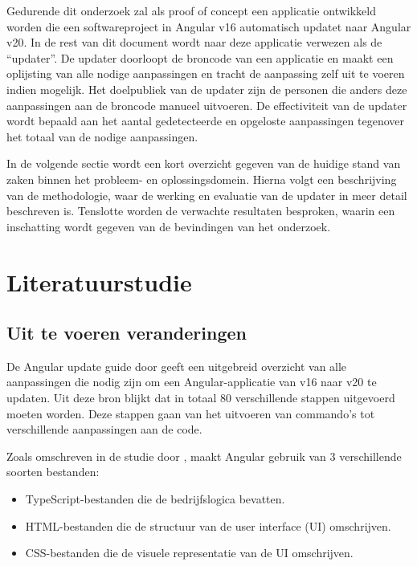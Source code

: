 Gedurende dit onderzoek zal als proof of concept een applicatie ontwikkeld worden die een softwareproject in Angular v16 automatisch updatet naar Angular v20.
In de rest van dit document wordt naar deze applicatie verwezen als de ``updater''.
De updater doorloopt de broncode van een applicatie en maakt een oplijsting van alle nodige aanpassingen en tracht de aanpassing zelf uit te voeren indien mogelijk.
Het doelpubliek van de updater zijn de personen die anders deze aanpassingen aan de broncode manueel uitvoeren.
De effectiviteit van de updater wordt bepaald aan het aantal gedetecteerde en opgeloste aanpassingen tegenover het totaal van de nodige aanpassingen.

In de volgende sectie wordt een kort overzicht gegeven van de huidige stand van zaken binnen het probleem- en oplossingsdomein.
Hierna volgt een beschrijving van de methodologie, waar de werking en evaluatie van de updater in meer detail beschreven is.
Tenslotte worden de verwachte resultaten besproken, waarin een inschatting wordt gegeven van de bevindingen van het onderzoek.

\section{Literatuurstudie}
\label{sec:literatuurstudie}

\subsection{Uit te voeren veranderingen}

De Angular update guide door \textcite{AngularUpdateGuide2025} geeft een uitgebreid overzicht van alle aanpassingen die nodig zijn om een Angular-applicatie van v16 naar v20 te updaten. 
Uit deze bron blijkt dat in totaal 80 verschillende stappen uitgevoerd moeten worden.
Deze stappen gaan van het uitvoeren van commando's tot verschillende aanpassingen aan de code.

Zoals omschreven in de studie door \textcite{Cincovic2020}, maakt Angular gebruik van 3 verschillende soorten bestanden:
\begin{itemize}
  \item TypeScript-bestanden die de bedrijfslogica bevatten.
  \item HTML-bestanden die de structuur van de user interface (UI) omschrijven.
  \item CSS-bestanden die de visuele representatie van de UI omschrijven.
\end{itemize}

